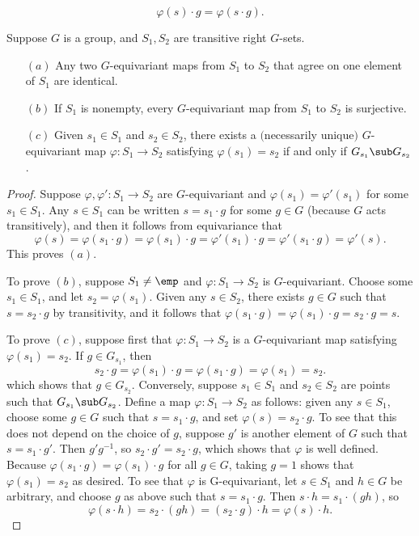 \[\varphi(s)\cdot g=\varphi(s\cdot g).\]
\begin{proposition}\label{G map prop}
Suppose $G$ is a group, and $S_1,S_2$ are transitive right $G$-sets.
\begin{itemize}
\item[$(a)$] Any two $G$-equivariant maps from $S_1$ to $S_2$ that agree on one element of $S_1$ are identical.
\item[$(b)$] If $S_1$ is nonempty, every $G$-equivariant map from $S_1$ to $S_2$ is surjective.
\item[$(c)$] Given $s_1\in S_1$ and $s_2\in S_2$, there exists a $($necessarily unique$)$ $G$-equivariant map $\varphi:S_1\to S_2$ satisfying $\varphi(s_1)=s_2$ if and only if $G_{s_1}\sub G_{s_2}$.
\end{itemize}
\end{proposition}
\begin{proof}
Suppose $\varphi,\varphi':S_1\to S_2$ are $G$-equivariant and $\varphi(s_1)=\varphi'(s_1)$ for some $s_1\in S_1$. Any $s\in S_1$ can be written $s=s_1\cdot g$ for some $g\in G$ (because $G$ acts transitively), and then it follows from equivariance that
\[\varphi(s)=\varphi(s_1\cdot g)=\varphi(s_1)\cdot g=\varphi'(s_1)\cdot g=\varphi'(s_1\cdot g)=\varphi'(s).\]
This proves $(a)$.\par
To prove $(b)$, suppose $S_1\neq \emp$ and $\varphi:S_1\to S_2$ is $G$-equivariant. Choose some $s_1\in S_1$, and let $s_2=\varphi(s_1)$. Given any $s\in S_2$, there exists $g\in G$ such that $s=s_2\cdot g$ by transitivity, and it follows that $\varphi(s_1\cdot g)=\varphi(s_1)\cdot g=s_2\cdot g=s$.\par
To prove $(c)$, suppose first that $\varphi:S_1\to S_2$ is a $G$-equivariant map satisfying $\varphi(s_1)=s_2$. If $g\in G_{s_1}$, then
\[s_2\cdot g=\varphi(s_1)\cdot g=\varphi(s_1\cdot g)=\varphi(s_1)=s_2.\]
which shows that $g\in G_{s_2}$. Conversely, suppose $s_1\in S_1$ and $s_2\in S_2$ are points such that $G_{s_1}\sub G_{s_2}$. Define a map $\varphi:S_1\to S_2$ as follows: given any $s\in S_1$, choose some $g\in G$ such that $s=s_1\cdot g$, and set $\varphi(s)=s_2\cdot g$. To see that this does not depend on the choice of $g$, suppose $g'$ is another element of $G$ such that $s=s_1\cdot g'$. Then $g'g^{-1}$, so $s_2\cdot g'=s_2\cdot g$, which shows that $\varphi$ is well defined. Because $\varphi(s_1\cdot g)=\varphi(s_1)\cdot g$ for all $g\in G$, taking $g=1$ shows that $\varphi(s_1)=s_2$ as desired. To see that $\varphi$ is G-equivariant, let $s\in S_1$ and $h\in G$ be arbitrary, and choose $g$ as above such that $s=s_1\cdot g$. Then $s\cdot h=s_1\cdot(gh)$, so
\[\varphi(s\cdot h)=s_2\cdot(gh)=(s_2\cdot g)\cdot h=\varphi(s)\cdot h.\]
\end{proof}

